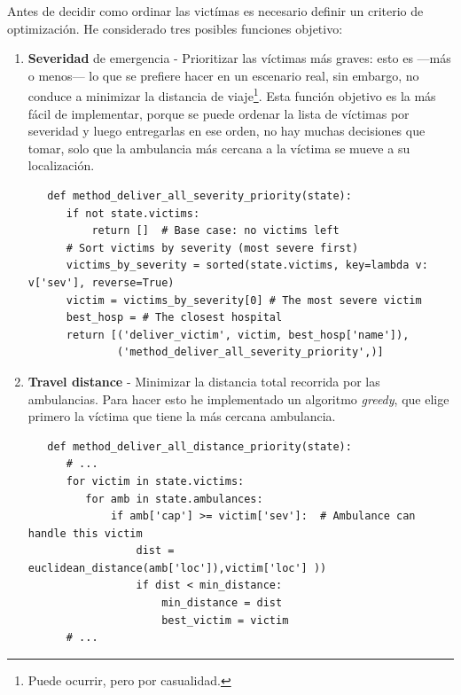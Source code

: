 Antes de decidir como ordinar las victímas es necesario definir un criterio de optimización. He considerado tres posibles funciones objetivo:
\begin{enumerate}
   \item \textbf{Severidad} de emergencia - Prioritizar las víctimas más graves: esto es ---más o menos--- lo que se prefiere hacer en un escenario real, sin embargo, no conduce a minimizar la distancia de viaje\footnote{Puede ocurrir, pero por casualidad.}.
   Esta función objetivo es la más fácil de implementar, porque se puede ordenar la lista de víctimas por severidad y luego entregarlas en ese orden, no hay muchas decisiones que tomar, solo que la ambulancia más cercana a la víctima se mueve a su localización.
   \begin{lstlisting}
   def method_deliver_all_severity_priority(state):
      if not state.victims:
          return []  # Base case: no victims left
      # Sort victims by severity (most severe first)
      victims_by_severity = sorted(state.victims, key=lambda v: v['sev'], reverse=True)
      victim = victims_by_severity[0] # The most severe victim
      best_hosp = # The closest hospital
      return [('deliver_victim', victim, best_hosp['name']),
              ('method_deliver_all_severity_priority',)]
   \end{lstlisting}
   \newpage
   \item \textbf{Travel distance} - Minimizar la distancia total recorrida por las ambulancias. Para hacer esto he implementado un algoritmo \textit{greedy}, que elige primero la víctima que tiene la más cercana ambulancia. 
   \begin{lstlisting}
   def method_deliver_all_distance_priority(state):
      # ...
      for victim in state.victims:
         for amb in state.ambulances:
             if amb['cap'] >= victim['sev']:  # Ambulance can handle this victim
                 dist = euclidean_distance(amb['loc']),victim['loc'] ))
                 if dist < min_distance:
                     min_distance = dist
                     best_victim = victim
      # ...
   \end{lstlisting}


\end{enumerate}
